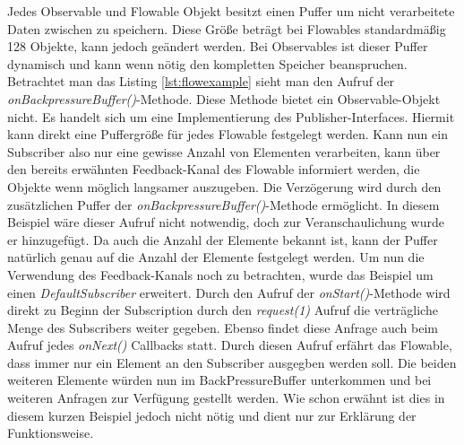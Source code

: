 
Jedes Observable und Flowable Objekt besitzt einen Puffer um nicht verarbeitete Daten zwischen zu speichern. Diese Größe beträgt bei Flowables standardmäßig 128 Objekte, kann jedoch geändert werden. Bei Observables ist dieser Puffer dynamisch und kann wenn nötig den kompletten Speicher beanspruchen. Betrachtet man das Listing \ref{lst:flowexample} sieht man den Aufruf der \textit{onBackpressureBuffer()}-Methode. Diese Methode bietet ein Observable-Objekt nicht. Es handelt sich um eine Implementierung des Publisher-Interfaces. Hiermit kann direkt eine Puffergröße für jedes Flowable festgelegt werden. Kann nun ein Subscriber also nur eine gewisse Anzahl von Elementen verarbeiten, kann über den bereits erwähnten Feedback-Kanal des Flowable informiert werden, die Objekte wenn möglich langsamer auszugeben. Die Verzögerung wird durch den zusätzlichen Puffer der \textit{onBackpressureBuffer()}-Methode ermöglicht. In diesem Beispiel wäre dieser Aufruf nicht notwendig, doch zur Veranschaulichung wurde er hinzugefügt. Da auch die Anzahl der Elemente bekannt ist, kann der Puffer natürlich genau auf die Anzahl der Elemente festgelegt werden.
Um nun die Verwendung des Feedback-Kanals noch zu betrachten, wurde das Beispiel um einen \textit{DefaultSubscriber} erweitert.
Durch den Aufruf der \textit{onStart()}-Methode wird direkt zu Beginn der Subscription durch den \textit{request(1)} Aufruf die verträgliche Menge des Subscribers weiter gegeben. Ebenso findet diese Anfrage auch beim Aufruf jedes \textit{onNext()} Callbacks statt. Durch diesen Aufruf erfährt das Flowable, dass immer nur ein Element an den Subscriber ausgegben werden soll. Die beiden weiteren Elemente würden nun im BackPressureBuffer unterkommen und bei weiteren Anfragen zur Verfügung gestellt werden. Wie schon erwähnt ist dies in diesem kurzen Beispiel jedoch nicht nötig und dient nur zur Erklärung der Funktionsweise.
